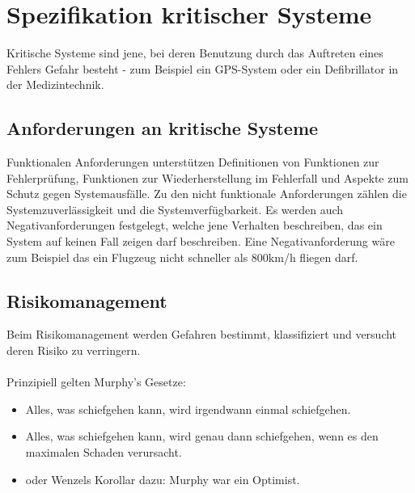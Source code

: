 \section{Spezifikation kritischer Systeme}
Kritische Systeme sind jene, bei deren Benutzung durch das Auftreten eines Fehlers Gefahr besteht - zum Beispiel ein GPS-System oder ein Defibrillator in der Medizintechnik.

\subsection{Anforderungen an kritische Systeme}
Funktionalen Anforderungen unterstützen Definitionen von  Funktionen zur Fehlerprüfung, Funktionen zur Wiederherstellung im Fehlerfall und Aspekte zum Schutz gegen Systemausfälle. Zu den nicht funktionale Anforderungen zählen die Systemzuverlässigkeit und die Systemverfügbarkeit. Es werden auch Negativanforderungen festgelegt, welche jene Verhalten beschreiben, das ein System auf keinen Fall zeigen darf beschreiben. Eine Negativanforderung wäre zum Beispiel das ein Flugzeug nicht schneller als 800km/h fliegen darf.


\subsection{Risikomanagement}
Beim Risikomanagement werden Gefahren bestimmt, klassifiziert und versucht deren Risiko zu verringern.
\\\\
Prinzipiell gelten Murphy's Gesetze:
\begin{itemize}
\item Alles, was schiefgehen kann, wird irgendwann einmal schiefgehen.
\item Alles, was schiefgehen kann, wird genau dann schiefgehen, wenn es den maximalen Schaden verursacht.
\item oder Wenzels Korollar dazu: Murphy war ein Optimist.
\end{itemize}

